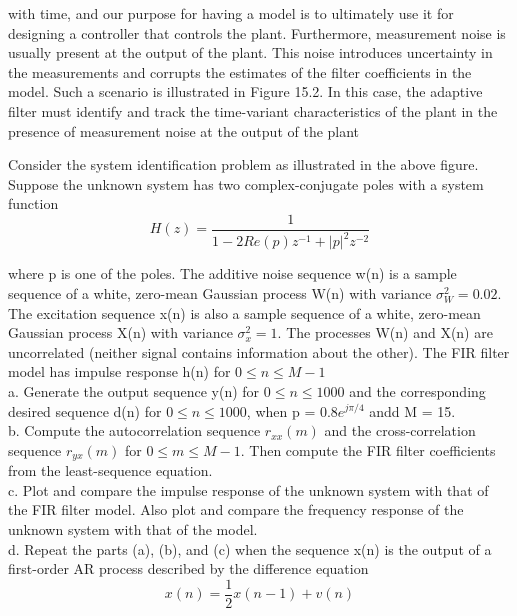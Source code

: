 \documentclass{article}
\begin{document}
with time, and our purpose for having a model is to ultimately use it for designing a controller that controls the plant. Furthermore, measurement
noise is usually present at the output of the plant. This noise introduces
uncertainty in the measurements and corrupts the estimates of the filter
coefficients in the model. Such a scenario is illustrated in Figure 15.2.
In this case, the adaptive filter must identify and track the time-variant
characteristics of the plant in the presence of measurement noise at the
output of the plant
\begin{center}
Consider the system identification problem as illustrated in the above figure. Suppose
the unknown system has two complex-conjugate poles with a system function
\begin{equation}
H(z) = \frac{1}{1-2Re(p)z^{-1}+|p|^2z^{-2}}
\end{equation}
\end{center}
where p is one of the poles. The additive noise sequence w(n) is a sample
sequence of a white, zero-mean Gaussian process W(n) with variance $\sigma^2_W=0.02$. The excitation sequence x(n) is also a sample sequence of a white, zero-mean Gaussian process X(n) with variance $\sigma^2_x=1$. The processes W(n) and X(n) are
uncorrelated (neither signal contains information about the other). The FIR filter model has impulse response h(n) for $0 \leq n \leq M - 1$ \\
\vspace{1em}
a. Generate the output sequence y(n) for $0 \leq n \leq 1000$ and the corresponding
desired sequence d(n) for $0 \leq n \leq 1000$, when p = $0.8e^{j\pi/4}$ andd M = 15. \\
\vspace{1em}
b. Compute the autocorrelation sequence $r_{xx}(m)$ and the cross-correlation sequence $r_{yx}(m) $ for $0 \leq m \leq M-1 $. Then compute the FIR filter coefficients
from the least-sequence equation. \\
\vspace{1em}
c. Plot and compare the impulse response of the unknown system with that of
the FIR filter model. Also plot and compare the frequency response of the
unknown system with that of the model. \\
\vspace{1em}
d. Repeat the parts (a), (b), and (c) when the sequence x(n) is the output of a
first-order AR process described by the difference equation
\begin{equation}
x(n) = \frac{1}{2}x(n-1)+v(n)
\end{equation}
\end{document}
